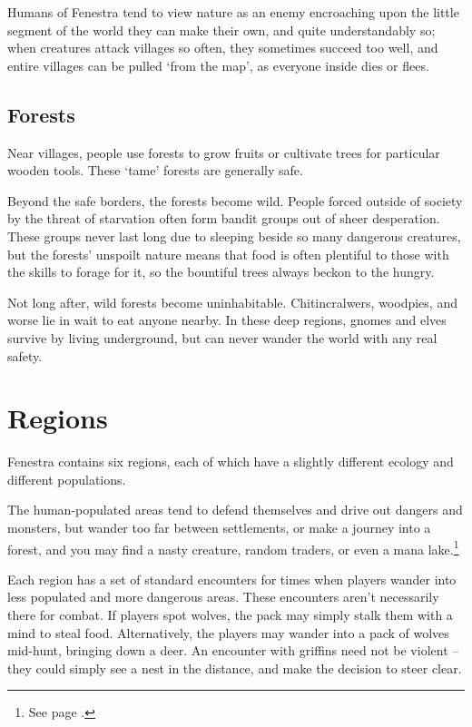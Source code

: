 Humans of Fenestra tend to view nature as an enemy encroaching upon the little segment of the world they can make their own, and quite understandably so; when creatures attack villages so often, they sometimes succeed too well, and entire villages can be pulled `from the map', as everyone inside dies or flees.

\subsection{Forests}

Near villages, people use forests to grow fruits or cultivate trees for particular wooden tools.  These `tame' forests are generally safe.

Beyond the safe borders, the forests become wild.  People forced outside of society by the threat of starvation often form bandit groups out of sheer desperation.  These groups never last long due to sleeping beside so many dangerous creatures, but the forests' unspoilt nature means that food is often plentiful to those with the skills to forage for it, so the bountiful trees always beckon to the hungry.

Not long after, wild forests become uninhabitable.  Chitincralwers, woodpies, and worse lie in wait to eat anyone nearby.  In these deep regions, gnomes and elves survive by living underground, but can never wander the world with any real safety.

\section{Regions}\label{encounters}

Fenestra contains six regions, each of which have a slightly different ecology and different populations.

The human-populated areas tend to defend themselves and drive out dangers and monsters, but wander too far between settlements, or make a journey into a forest, and you may find a nasty creature, random traders, or even a mana lake.\footnote{See page \pageref{mana_lake}.}

Each region has a set of standard encounters for times when players wander into less populated and more dangerous areas.  These encounters aren't necessarily there for combat.  If players spot wolves, the pack may simply stalk them with a mind to steal food.  Alternatively, the players may wander into a pack of wolves mid-hunt, bringing down a deer.  An encounter with griffins need not be violent -- they could simply see a nest in the distance, and make the decision to steer clear.


